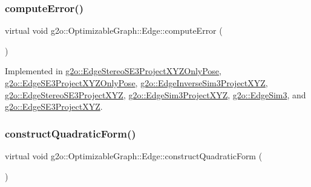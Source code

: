 \mbox{\label{classg2o_1_1_optimizable_graph_1_1_edge_a1e6d9f4128866982de5e11e03edd7775}} 
\subsubsection{\texorpdfstring{compute\+Error()}{computeError()}}
{\footnotesize\ttfamily virtual void g2o\+::\+Optimizable\+Graph\+::\+Edge\+::compute\+Error (\begin{DoxyParamCaption}{ }\end{DoxyParamCaption})\hspace{0.3cm}{\ttfamily [pure virtual]}}



Implemented in \mbox{\hyperlink{classg2o_1_1_edge_stereo_s_e3_project_x_y_z_only_pose_af6fd2fdbdc9b4a6bcf21303ff3b8ea83}{g2o\+::\+Edge\+Stereo\+S\+E3\+Project\+X\+Y\+Z\+Only\+Pose}}, \mbox{\hyperlink{classg2o_1_1_edge_s_e3_project_x_y_z_only_pose_a6752098d3322d30e43a6a3a668a3b009}{g2o\+::\+Edge\+S\+E3\+Project\+X\+Y\+Z\+Only\+Pose}}, \mbox{\hyperlink{classg2o_1_1_edge_inverse_sim3_project_x_y_z_a8fa376524e861ae8c4f1a360d217f02d}{g2o\+::\+Edge\+Inverse\+Sim3\+Project\+X\+YZ}}, \mbox{\hyperlink{classg2o_1_1_edge_stereo_s_e3_project_x_y_z_ab60521439da10eabb13f23fe21fbe651}{g2o\+::\+Edge\+Stereo\+S\+E3\+Project\+X\+YZ}}, \mbox{\hyperlink{classg2o_1_1_edge_sim3_project_x_y_z_ae821156265db463d49b9ac2166186274}{g2o\+::\+Edge\+Sim3\+Project\+X\+YZ}}, \mbox{\hyperlink{classg2o_1_1_edge_sim3_a68f55d11f6b8b210318f167d04722a8b}{g2o\+::\+Edge\+Sim3}}, and \mbox{\hyperlink{classg2o_1_1_edge_s_e3_project_x_y_z_a79a763e1d42fe9eb5732abe59c7723d9}{g2o\+::\+Edge\+S\+E3\+Project\+X\+YZ}}.

\mbox{\label{classg2o_1_1_optimizable_graph_1_1_edge_a56fbf3430ddf591e3c619bdd1b7e4499}} 
\subsubsection{\texorpdfstring{construct\+Quadratic\+Form()}{constructQuadraticForm()}}
{\footnotesize\ttfamily virtual void g2o\+::\+Optimizable\+Graph\+::\+Edge\+::construct\+Quadratic\+Form (\begin{DoxyParamCaption}{ }\end{DoxyParamCaption})\hspace{0.3cm}{\ttfamily [pure virtual]}}

